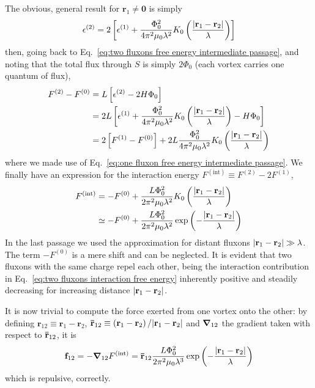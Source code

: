 The obvious, general result for $\mathbf{r}_1 \neq \mathbf{0}$ is simply
\[
	\epsilon^{(2)} = 2 \left[{ \epsilon^{(1)} + \frac{\Phi_0^2}{4\pi^2\mu_0 \lambda^2} K_0 \left({\frac{\abs{\mathbf{r}_1-\mathbf{r}_2}}{\lambda}}\right) }\right]
\]
then, going back to Eq.~\eqref{eq:two fluxons free energy intermediate passage}, and noting that the total flux through $S$ is simply $2\Phi_0$ (each vortex carries one quantum of flux),
\[
\begin{aligned}
	F^{(2)} - F^{(0)} &= L \left[{\epsilon^{(2)}- 2H\Phi_0}\right] \\
	&= 2L \left[{\epsilon^{(1)} + \frac{\Phi_0^2}{4\pi^2\mu_0 \lambda^2} K_0 \left({\frac{\abs{\mathbf{r}_1-\mathbf{r}_2}}{\lambda}}\right) - H\Phi_0}\right] \\
	&= 2 \left[{F^{(1)} - F^{(0)}}\right] + 2L \frac{\Phi_0^2}{4\pi^2\mu_0 \lambda^2} K_0 \left({\frac{\abs{\mathbf{r}_1-\mathbf{r}_2}}{\lambda}}\right)
\end{aligned}
\]
where we made use of Eq.~\eqref{eq:one fluxon free energy intermediate passage}. We finally have an expression for the interaction energy $F^{(\mathrm{int})} \equiv F^{(2)} - 2F^{(1)}$,
\begin{align}
	F^{(\mathrm{int})} &= - F^{(0)} + \frac{L \Phi_0^2}{2\pi^2\mu_0 \lambda^2} K_0 \left({\frac{\abs{\mathbf{r}_1-\mathbf{r}_2}}{\lambda}}\right) \nonumber \\
	&\simeq - F^{(0)} + \frac{L \Phi_0^2}{2\pi^2\mu_0 \lambda^2} \exp \left({- \frac{\abs{\mathbf{r}_1-\mathbf{r}_2}}{\lambda} }\right) \label{eq:two fluxons interaction free energy}
\end{align}
In the last passage we used the approximation for distant fluxons $\abs{\mathbf{r}_1-\mathbf{r}_2} \gg \lambda$. The term $- F^{(0)}$ is a mere shift and can be neglected. It is evident that two fluxons with the same charge repel each other, being the interaction contribution in Eq.~\eqref{eq:two fluxons interaction free energy} inherently positive and steadily decreasing for increasing distance $\abs{\mathbf{r}_1-\mathbf{r}_2}$.

It is now trivial to compute the force exerted from one vortex onto the other: by defining $\mathbf{r}_{12} \equiv \mathbf{r}_1-\mathbf{r}_2$, $\mathbf{\bar{r}}_{12} \equiv \left({\mathbf{r}_1-\mathbf{r}_2}\right)/\abs{\mathbf{r}_1-\mathbf{r}_2}$ and $\grad_{12}$ the gradient taken with respect to $\mathbf{\bar{r}}_{12}$, it is
\[
	\mathbf{f}_{12} = - \grad_{12} F^{(\mathrm{int})} = \mathbf{\bar{r}}_{12} \frac{L \Phi_0^2}{2\pi^2\mu_0 \lambda^3} \exp \left({- \frac{\abs{\mathbf{r}_1-\mathbf{r}_2}}{\lambda} }\right)
\]
which is repulsive, correctly.


